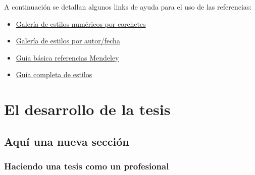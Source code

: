 A continuación se detallan algunos links de ayuda para el uso de las referencias:

\begin{itemize}
    \item \href{https://www.bibtex.com/bibliography-styles-numeric-square-brackets/}{Galería de estilos numéricos por corchetes}
    \item \href{https://www.bibtex.com/bibliography-styles-author-date/}{Galería de estilos por autor/fecha}
    \item \href{https://latex.ppizarror.com/res/guia_basica_referencias_mendeley_v3.pdf}{Guía básica referencias Mendeley}
    \item \href{https://homepage.stat.uiowa.edu/~rlenth/ALPHA/bibstylescompared.pdf}{Guía completa de estilos}
\end{itemize}


\chapter{El desarrollo de la tesis}

\section{Aquí una nueva sección}

\subsection{Haciendo una tesis como un profesional}


	~ \lipsum[6]

	\newp ~ \lipsum[115]

	
